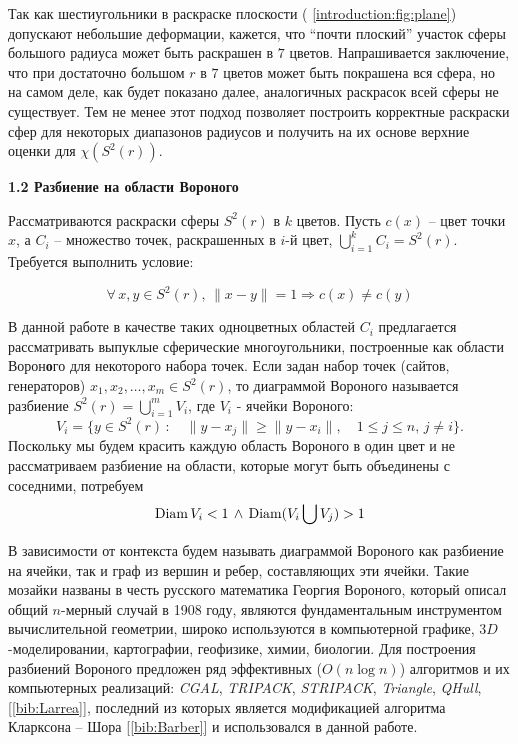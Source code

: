 Так как шестиугольники в раскраске плоскости (\figurename{ \ref{introduction:fig:plane}}) допускают небольшие деформации, кажется, что \enquote{почти плоский} участок сферы большого радиуса может быть раскрашен в $7$ цветов. Напрашивается заключение, что при достаточно большом $r$ в $7$ цветов может быть покрашена вся сфера, но на самом деле, как будет показано далее, аналогичных раскрасок всей сферы не существует. Тем не менее этот подход позволяет построить корректные 
раскраски сфер для некоторых диапазонов радиусов и получить на их основе верхние оценки для $\chi(S^2(r))$.

\vspace{5pt}
\textbf{1.2 Разбиение на области Вороного}\label{chapters:1.2}
\vspace{5pt}

Рассматриваются раскраски сферы $S^2(r)$ в $k$ цветов. 
Пусть $c(x)$ -- цвет точки $x$, а $C_i$ -- множество точек, раскрашенных в $i$-й цвет, $\bigcup\limits_{i=1}^{k} C_i = S^2(r)$. 
Требуется выполнить условие:

\begin{equation}\label{chapter1:propercoloring}
\forall \, x,y \in S^2(r), \, \|x - y\|=1 \Rightarrow c(x) \ne c(y)
\end{equation}

В данной работе в качестве таких одноцветных областей $C_i$ предлагается 
рассматривать выпуклые сферические многоугольники, построенные как области Ворон\textbf{о}го для некоторого набора точек.
Если задан набор точек (сайтов, генераторов) $x_1, x_2, \dots , x_m \in S^2(r)$, то диаграммой Вороного называется разбиение
$S^2(r)= \bigcup\limits_{i=1}^m V_i$, где $V_i$ - ячейки Вороного:
$$V_i = \{y \in S^2(r) \, : \quad \|y - x_j\| \geq \|y - x_i\|, \quad 1 \leq j \leq n, \, j \neq i \}.$$
Поскольку мы будем красить каждую область Вороного в один цвет и не 
рассматриваем разбиение на области, которые могут быть объединены с соседними, потребуем
\begin{equation}\label{chapter1:eq:diams}
\operatorname{Diam} V_i < 1 \, \land \, \operatorname{Diam} (V_i \bigcup V_j) > 1
\end{equation}

В зависимости от контекста будем называть диаграммой Вороного как разбиение на ячейки, так и граф из вершин и ребер, составляющих эти ячейки. Такие мозайки названы в честь русского математика Георгия Вороного, который описал общий $n$-мерный случай в 1908 году,
являются фундаментальным инструментом вычислительной геометрии, широко используются в компьютерной графике, $3D$-моделировании, картографии, геофизике, химии, биологии. 
Для построения разбиений Вороного предложен ряд эффективных ($O(n\log{}n)$) алгоритмов и их компьютерных реализаций: 
\textit{CGAL}, \textit{TRIPACK}, \textit{STRIPACK}, \textit{Triangle}, \textit{QHull}, 
[\ref{bib:Larrea}], последний из которых является модификацией алгоритма Кларксона -- Шора [\ref{bib:Barber}] и использовался в данной работе.

